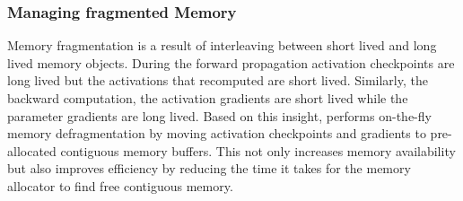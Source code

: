 \subsubsection{Managing fragmented Memory} Memory fragmentation is a result of interleaving between short lived and long lived memory objects. During the forward propagation activation checkpoints are long lived but the activations that recomputed are short lived. Similarly, the backward computation, the activation gradients are short lived while the parameter gradients are long lived. Based on this insight, \name performs on-the-fly memory defragmentation by moving activation checkpoints and gradients to pre-allocated contiguous memory buffers. This not only increases memory availability but also improves efficiency by reducing the time it takes for the memory allocator to find free contiguous memory.  
\begin{comment}
Based on these insights, we develop \name --- Zero Redundancy Optimizer --- which overcomes the limitations of both data and MP still retaining their merits.   





\name powers DP to reduce memory consumption and boost runnable model size. Additionally, it can be used in parallel with any MP approach.  When a training job uses both MP and \name-powered DP, its memory saving (per device) is the product of the saving from MP and that from \name (Section \ref{sec:modelparallelism}).
\end{comment}

\begin{comment}
As for the relationship of \name with data and MP, \name optimizes the memory usage during DP process while retaining compute/communication efficiency, and it can be used in parallel . 
\end{comment}

